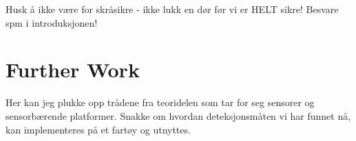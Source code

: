 Husk å ikke være for skråsikre - ikke lukk en dør før vi er HELT sikre!
Besvare spm i introduksjonen!

\section{Further Work}
Her kan jeg plukke opp trådene fra teoridelen som tar for seg sensorer og sensorbærende platformer. Snakke om hvordan deteksjonsmåten vi har funnet nå, kan implementeres på et fartøy og utnyttes.